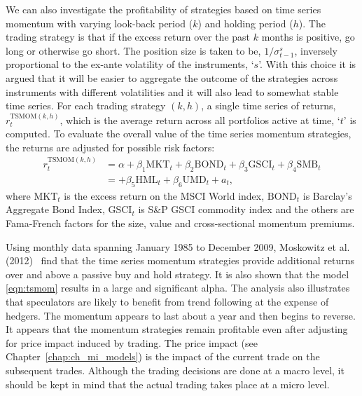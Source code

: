 We can also investigate the profitability of strategies based on time series momentum with varying look-back period ($k$) and holding period ($h$). The trading strategy is that if the excess return over the past $k$ months is positive, go long or otherwise go short. The position size is taken to be, $1/\sigma_{t-1}^s$, inversely proportional to the ex-ante volatility of the instruments, `$s$'. With this choice it is argued that it will be easier to aggregate the outcome of the strategies across instruments with different volatilities and it will also lead to somewhat stable time series. For each trading strategy $(k, h)$, a single time series of returns, $r_t^{\text{TSMOM}(k,h)}$, which is the average return across all portfolios active at time, `$t$' is computed. To evaluate the overall value of the time series momentum strategies, the returns are adjusted for possible risk factors:
	\begin{equation} \label{eqn:tsmom}
	\begin{split}
	r_t^{\text{TSMOM}(k,h)}&= \alpha + \beta_1 \text{MKT}_t + \beta_2 \text{BOND}_t + \beta_3 \text{GSCI}_t + \beta_4 \text{SMB}_t \\
	&=  + \beta_5 \text{HML}_t + \beta_6 \text{UMD}_t + a_t,
	\end{split}
	\end{equation}
where $\text{MKT}_t$ is the excess return on the MSCI World index, $\text{BOND}_t$ is Barclay's Aggregate Bond Index, $\text{GSCI}_t$ is S\&P GSCI commodity index and the others are Fama-French factors for the size, value and cross-sectional momentum premiums.


Using monthly data spanning January 1985 to December 2009, Moskowitz et al. (2012)~\cite{mos2012} find that the time series momentum strategies provide additional returns over and above a passive buy and hold strategy. It is also shown that the model \eqref{eqn:tsmom} results in a large and significant alpha. The analysis also illustrates that speculators are likely to benefit from trend following at the expense of hedgers. The momentum appears to last about a year and then begins to reverse. It appears that the momentum strategies remain profitable even after adjusting for price impact induced by trading. The price impact (see Chapter~\ref{chap:ch_mi_models}) is the impact of the current trade on the subsequent trades. Although the trading decisions are done at a macro level, it should be kept in mind that the actual trading takes place at a micro level.  



